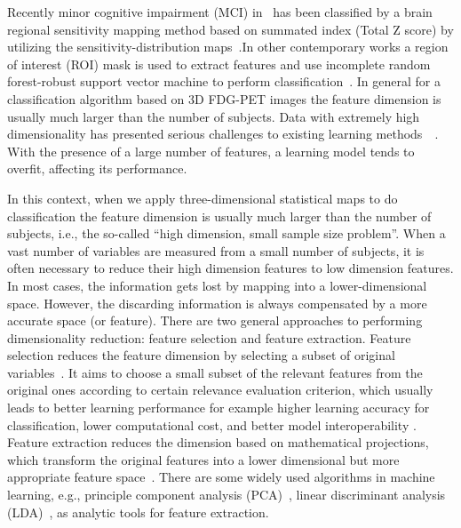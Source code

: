 Recently minor cognitive impairment (MCI) in \FDGPET ~has been classified by a brain regional sensitivity mapping method based on summated index (Total Z score) by utilizing the sensitivity-distribution maps~\citep{kakimoto2011new}.In other contemporary works a region of interest (ROI) mask is used to extract features and use incomplete random forest-robust support vector machine to perform classification~\citep{lu2017early}. In general for a classification algorithm based on 3D FDG-PET images the feature dimension is usually much larger than the number of subjects. Data with extremely high dimensionality has presented serious challenges to existing learning methods~\citep{liu2007computational}~\citep{friedman2001elements}. With the presence of a large number of features, a learning model tends to overfit, affecting its performance.

In this context, when we apply three-dimensional statistical maps to do classification the feature dimension is usually much larger than the number of subjects, i.e., the so-called “high dimension, small sample size problem”. When a vast number of variables are measured from a small number of subjects, it is often necessary to reduce their high dimension features to low dimension features. In most cases, the information gets lost by mapping into a lower-dimensional space. However, the discarding information is always compensated by a more accurate space (or feature). There are two general approaches to performing dimensionality reduction: feature selection and feature extraction. Feature selection reduces the feature dimension by selecting a subset of original variables~\citep{jain1997feature}. It aims to choose a small subset of the relevant features from the original ones according to certain relevance evaluation criterion, which usually leads to better learning performance for example higher learning accuracy for classification, lower computational cost, and better model interoperability \citep{tang2014feature}. Feature extraction reduces the dimension based on mathematical projections, which transform the original features into a lower dimensional but more appropriate feature space~\citep{guyon2008feature}. There are some widely used algorithms in machine learning, e.g., principle component analysis (PCA)~\citep{jolliffe2002principal}, linear discriminant analysis (LDA)~\citep{mika1999fisher}, as analytic tools for feature extraction.

